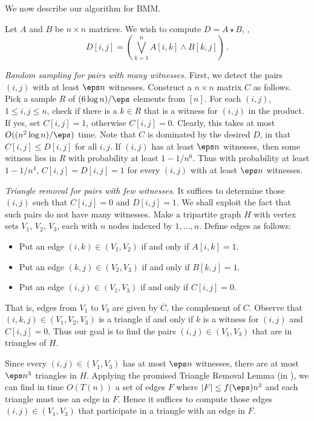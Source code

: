 We now describe our algorithm for BMM.

\smallskip

 Let $A$ and $B$ be $n \times n$ matrices. We wish to compute $D = A \star B$, \ie,
\[
D[i,j] = \left(\bigvee_{k=1}^n A[i,k] \wedge B[k,j]\right)\,.
\] 

\smallskip

\noindent
\emph{Random sampling for pairs with many witnesses.}
First, we detect the pairs $(i,j)$ with at least $\eps n$ witnesses.
Construct a $n\times n$ matrix $C$  as follows. Pick a sample $R$ of $(6\log n)/\eps$ elements from $[n]$.
For each $(i,j)$,  $1 \leq i,j \leq n$, check if there is a $k \in R$ that is a witness for $(i,j)$ in the product. If yes, set $C[i,j]=1$, otherwise $C[i,j]=0$. Clearly, this takes at most $O((n^2 \log n) /\eps)$ time. Note that  $C$ is dominated by the desired $D$, in that $C[i,j] \leq D[i,j]$ for all $i,j$.
If $(i,j)$ has at least $\eps n$ witnesses, then some witness lies in $R$ with probability at least $1-1/n^6$. Thus with probability at least $1-1/n^4$, $C[i,j]=D[i,j]=1$ for every $(i,j)$ with at least $\eps n$ witnesses.

\smallskip

\noindent
\emph{Triangle removal for pairs with few witnesses.} It suffices to determine those $(i,j)$ such that $C[i,j] = 0$ and $D[i,j] = 1$. We shall exploit the fact that such pairs do not have many witnesses. Make a tripartite graph $H$ with vertex sets $V_1$, $V_2$, $V_3$, each with $n$ nodes indexed by $1,\ldots,n$. Define edges as follows:
\begin{itemize}
\item Put an edge $(i,k) \in (V_1,V_2)$ if and only if $A[i,k]=1$.
\item Put an edge  $(k,j) \in (V_2,V_3)$  if and only if $B[k,j]=1$.
\item Put an edge $(i,j) \in (V_1,V_3)$ if and only if $C[i,j]=0$.\end{itemize}
That is, edges from $V_1$ to $V_3$ are given by $\overline{C}$, the complement of $C$. Observe that
$(i,k,j) \in (V_1,V_2,V_3)$ is a triangle if and only if $k$ is a witness for $(i,j)$ and $C[i,j] = 0$. Thus our goal is to find the pairs $(i,j)\in (V_1,V_3)$ that are in triangles of $H$.

Since every $(i,j) \in (V_1,V_3)$ has at most $\eps n$ witnesses, there are at most $\eps n^3$ triangles in $H$. Applying the promised Triangle Removal Lemma (in ), we can find in time $O(T(n))$ a set of edges $F$ where $|F| \leq f(\eps) n^2$ and each triangle must use an edge in $F$. Hence it suffices to compute those edges $(i,j) \in (V_1,V_3)$ that participate in a triangle with an edge in $F$. 

